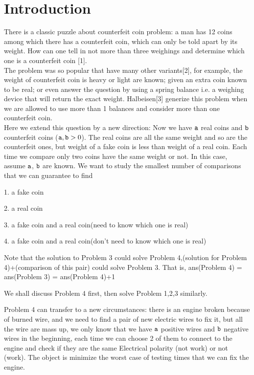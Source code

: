 \section{Introduction}

There is a classic puzzle about counterfeit coin problem: a man has 12 coins among which there has a counterfeit coin, which can only be told apart by its weight. How can one tell in not more than three weighings and determine which one is a counterfeit coin [1].  \\


The problem was so popular that have many other variants[2], for example, the weight of counterfeit coin is heavy or light are known; given an extra coin known to be real; or even answer the question by using a spring balance i.e. a weighing device that will return the exact weight. Halbeisen[3] generize this problem when we are allowed to use more than 1 balances and consider more than one counterfeit coin.  \\



Here we extend this question by a new direction: Now we have $\mathtt{a}$ real coins and $\mathtt{b}$ counterfeit coins ($ \mathtt{a}, \mathtt{b} > 0$). The real coins are all the same weight and so are the counterfeit ones, but weight of a fake coin is less than weight of a real coin. Each time we compare only two coins have the same weight or not. In this case, assume $\mathtt{a}$, $\mathtt{b}$ are known. We want to study the smallest number of comparisons that we can guarantee to find 

1. a fake coin

2. a real coin

3. a fake coin and a real coin(need to know which one is real)

4. a fake coin and a real coin(don't need to know which one is real)

Note that the solution to Problem 3 could solve Problem 4,(solution for Problem 4)+(comparison of this pair) could solve Problem 3. That is, ans(Problem 4) = ans(Problem 3) = ans(Problem 4)+1

We shall discuss Problem 4 first, then solve Problem 1,2,3 similarly.

Problem 4 can transfer to a new circumstances: 
there is an engine broken because of burned wire, and we need to find a pair of new electric wires to fix it, but all the wire are mass up, we only know that we have $\mathtt{a}$ positive wires and $\mathtt{b}$ negative wires in the beginning, each time we can choose 2 of them to connect to the engine and check if they are the same Electrical polarity (not work) or not (work). The object is minimize the worst case of testing times that we can fix the engine.

